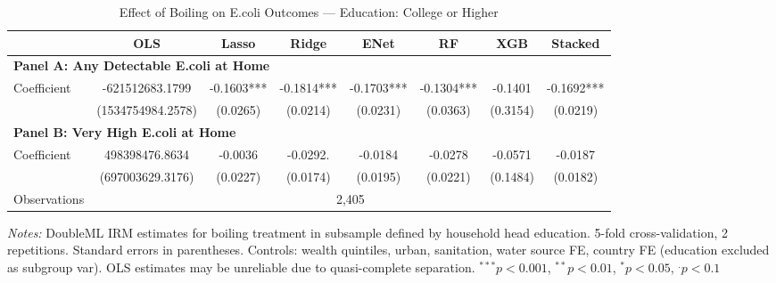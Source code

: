 \begin{table}[htbp]
\centering
\caption{Effect of Boiling on E.coli Outcomes --- Education: College or Higher}
\label{tab:cate_edu4}
\begin{tabular}{lccccccc}
\toprule
 & OLS & Lasso & Ridge & ENet & RF & XGB & Stacked \\
\midrule
\multicolumn{8}{l}{\textbf{Panel A: Any Detectable E.coli at Home}} \\
\midrule
Coefficient & -621512683.1799 & -0.1603*** & -0.1814*** & -0.1703*** & -0.1304*** & -0.1401 & -0.1692*** \\
 & (1534754984.2578) & (0.0265) & (0.0214) & (0.0231) & (0.0363) & (0.3154) & (0.0219) \\

\multicolumn{8}{l}{\textbf{Panel B: Very High E.coli at Home}} \\
\midrule
Coefficient & 498398476.8634 & -0.0036 & -0.0292. & -0.0184 & -0.0278 & -0.0571 & -0.0187 \\
 & (697003629.3176) & (0.0227) & (0.0174) & (0.0195) & (0.0221) & (0.1484) & (0.0182) \\

\midrule
Observations & \multicolumn{7}{c}{2,405} \\
\bottomrule
\end{tabular}
\begin{minipage}{\textwidth}
\footnotesize
\textit{Notes:} DoubleML IRM estimates for boiling treatment in subsample defined by household head education. 
5-fold cross-validation, 2 repetitions. Standard errors in parentheses. 
Controls: wealth quintiles, urban, sanitation, water source FE, country FE (education excluded as subgroup var). 
OLS estimates may be unreliable due to quasi-complete separation. 
$^{***}p<0.001$, $^{**}p<0.01$, $^{*}p<0.05$, $^{.}p<0.1$
\end{minipage}
\end{table}
